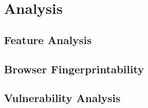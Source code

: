 \section{Analysis}
\label{sec: analysis}

\subsection{Feature Analysis}



\subsection{Browser Fingerprintability}



\subsection{Vulnerability Analysis}
